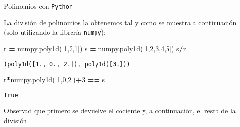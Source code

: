 \documentclass[
  ignorenonframetext,
]{beamer}
\newenvironment{Shaded}{\begin{snugshade}}{\end{snugshade}}
\newcommand{\DecValTok}[1]{\textcolor[rgb]{0.00,0.00,0.81}{#1}}
\newcommand{\NormalTok}[1]{#1}
\newcommand{\OperatorTok}[1]{\textcolor[rgb]{0.81,0.36,0.00}{\textbf{#1}}}
\begin{document}
\begin{frame}[fragile]{Polinomios con \texttt{Python}}
\protect\hypertarget{polinomios-con-python-9}{}

La división de polinomios la obtenemos tal y como se muestra a
continuación (solo utilizando la librería \texttt{numpy}):

\begin{Shaded}
\begin{Highlighting}[]
\NormalTok{r }\OperatorTok{=}\NormalTok{ numpy.poly1d([}\DecValTok{1}\NormalTok{,}\DecValTok{2}\NormalTok{,}\DecValTok{1}\NormalTok{]) }
\NormalTok{s }\OperatorTok{=}\NormalTok{ numpy.poly1d([}\DecValTok{1}\NormalTok{,}\DecValTok{2}\NormalTok{,}\DecValTok{3}\NormalTok{,}\DecValTok{4}\NormalTok{,}\DecValTok{5}\NormalTok{])}
\NormalTok{s}\OperatorTok{/}\NormalTok{r}
\end{Highlighting}
\end{Shaded}

\begin{verbatim}
(poly1d([1., 0., 2.]), poly1d([3.]))
\end{verbatim}

\begin{Shaded}
\begin{Highlighting}[]
\NormalTok{r}\OperatorTok{*}\NormalTok{numpy.poly1d([}\DecValTok{1}\NormalTok{,}\DecValTok{0}\NormalTok{,}\DecValTok{2}\NormalTok{])}\OperatorTok{+}\DecValTok{3} \OperatorTok{==}\NormalTok{ s}
\end{Highlighting}
\end{Shaded}

\begin{verbatim}
True
\end{verbatim}

Observad que primero se devuelve el cociente y, a continuación, el resto
de la división

\end{frame}
\end{document}
